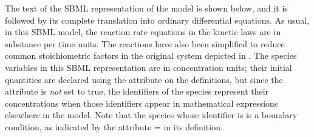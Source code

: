 The text of the SBML representation of the model is shown below,
and it is followed by its complete translation into ordinary
differential equations.  As usual, in this SBML model, the
reaction rate equations in the kinetic laws are in substance per
time units.  The reactions have also been simplified to reduce
common stoichiometric factors in the original system depicted in
.  The species variables in this SBML
representation are in concentration units; their initial
quantities are declared using the attribute 
on the  definitions, but since the attribute
 is \emph{not} set to true, the
identifiers of the species represent their concentrations when
those identifiers appear in mathematical expressions elsewhere in
the model.  Note that the species whose identifier is  is a
boundary condition, as indicated by the attribute
= in its definition.


